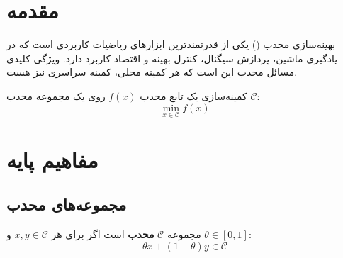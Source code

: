 \documentclass{matinbook}
\begin{document}
    \section{مقدمه}
    
    بهینه‌سازی محدب
    () یکی از
    قدرتمندترین ابزارهای ریاضیات کاربردی
    است که در یادگیری ماشین،
    پردازش سیگنال،
    کنترل بهینه و
    اقتصاد کاربرد دارد.
    ویژگی کلیدی مسائل محدب این است که
    هر کمینه محلی، کمینه سراسری نیز هست.
    
    \begin{definition}
        کمینه‌سازی یک تابع محدب $f(x)$
        روی یک مجموعه محدب $\mathcal{C}$:
        \[
        \min_{x \in \mathcal{C}} f(x)
        \]
        \label{def:convex-optimization}
    \end{definition}
    
    \section{مفاهیم پایه}
    
    \subsection{مجموعه‌های محدب}
    
    \begin{definition}
        مجموعه $\mathcal{C}$ \textbf{محدب} است
        اگر برای هر $x, y \in \mathcal{C}$
        و $\theta \in [0, 1]$:
        \[
        \theta x + (1-\theta)y \in \mathcal{C}
        \]
        \label{def:convex-set}
    \end{definition}
    
\end{document}
